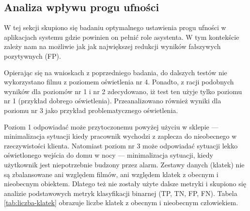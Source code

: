 \subsection{Analiza wpływu progu ufności}
W tej sekcji skupiono się badaniu optymalnego ustawienia progu ufności w aplikacjach systemu gdzie powinien on pełnić role asystenta. W tym kontekście zależy nam na możliwie jak jak największej redukcji wyników fałszywych pozytywnych (FP). 

Opierając się na wnioskach z poprzedniego badania, do dalszych testów nie wykorzystano filmu z poziomem oświetlenia nr 4. 
Ponadto, z racji podobnych wyników dla poziomów nr 1 i nr 2 zdecydowano, iż test ten użyje tylko poziomu nr 1 (przykład dobrego oświetlenia). Przeanalizowano również wyniki dla poziomu nr 3 jako przykład problematycznego oświetlenia. 

Poziom 1 odpowiadać może przytoczonemu powyżej użyciu w sklepie --- minimalizacja sytuacji kiedy pracownik wychodzi z zaplecza do nieobecnego w rzeczywistości klienta.
Natomiast poziom nr 3 może odpowiadać sytuacji lekko oświetlonego wejścia do domu w nocy --- minimalizacja sytuacji, kiedy użytkownik jest niepotrzebnie budzony przez alarm. Zestawy danych (klatek) nie są zbalansowane ani względem filmów, ani względem klatek z obecnym i nieobecnym obiektem. Dlatego też nie zostały użyte dalsze metryki i skupiono się analizie podstawowych metryk klasyfikacji binarnej (TP, TN, FP, FN). 
Tabela \ref{tab:liczba-klatek} obrazuje liczbe klatek z obecnym i nieobecnym człowiekiem.


